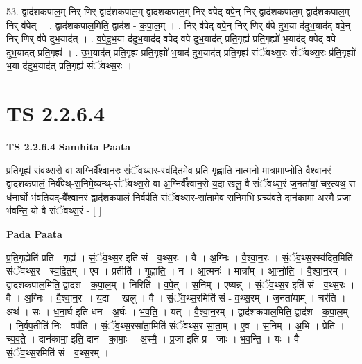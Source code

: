 \documentclass[17pt]{extarticle}
\begin{document}
53. द्वाद॑शकपाल॒म् निर् णिर् द्वाद॑शकपाल॒म् द्वाद॑शकपाल॒म् निर् व॑पेद् वपे॒न् निर् द्वाद॑शकपाल॒म् द्वाद॑शकपाल॒म् निर् व॑पेत् । . द्वाद॑शकपाल॒मिति॒ द्वाद॑श - क॒पा॒ल॒म् । . निर् व॑पेद् वपे॒न् निर् णिर् व॑पे दुभ॒या द॑दुभ॒याद॑द् वपे॒न् निर् णिर् व॑पे दुभ॒याद॑त् । . व॒पे॒दु॒भ॒या द॑दुभ॒याद॑द् वपेद् वपे दुभ॒याद॑त् प्रति॒गृह्य॑ प्रति॒गृह्यो॑ भ॒याद॑द् वपेद् वपे दुभ॒याद॑त् प्रति॒गृह्य॑ । . उ॒भ॒याद॑त् प्रति॒गृह्य॑ प्रति॒गृह्यो॑ भ॒याद॑ दुभ॒याद॑त् प्रति॒गृह्य॑ संॅवथ्स॒रः सं॑ॅवथ्स॒रः प्र॑ति॒गृह्यो॑ भ॒या द॑दुभ॒याद॑त् प्रति॒गृह्य॑ संॅवथ्स॒रः । \newline
\pagebreak
{}

\section{ TS 2.2.6.4 }

\textbf{TS 2.2.6.4 } \newline
\textbf{Samhita Paata} \newline

प्रति॒गृह्य॑ संवथ्स॒रो वा अ॒ग्निर्वै᳚श्वान॒रः सं॑ॅवथ्स॒र-स्व॑दितमे॒व प्रति॑ गृह्णाति॒ नात्मनो॒ मात्रा॑माप्नोति वैश्वान॒रं द्वाद॑शकपालं॒ निर्व॑पेथ्-स॒निमे॒ष्यन्थ्-सं॑ॅवथ्स॒रो वा अ॒ग्निर्वै᳚श्वान॒रो य॒दा खलु॒ वै सं॑ॅवथ्स॒रं ज॒नता॑यां॒ चर॒त्यथ॒ स ध॑ना॒र्घो भ॑वति॒यद्-वै᳚श्वान॒रं द्वाद॑शकपालं नि॒र्वप॑ति संॅवथ्स॒र-सा॑तामे॒व स॒निम॒भि प्रच्य॑वते॒ दान॑कामा अस्मै प्र॒जा भ॑वन्ति॒ यो वै सं॑ॅवथ्स॒रं - [  ] \newline

\textbf{Pada Paata} \newline

प्र॒ति॒गृह्येति॑ प्रति - गृह्य॑ । सं॒ॅव॒थ्स॒र इति॑ सं - व॒थ्स॒रः । वै । अ॒ग्निः । वै॒श्वा॒न॒रः । सं॒ॅव॒थ्स॒रस्व॑दित॒मिति॑ संॅवथ्स॒र - स्व॒दि॒त॒म् । ए॒व । प्रतीति॑ । गृ॒ह्णा॒ति॒ । न । आ॒त्मनः॑ । मात्रा᳚म् । आ॒प्नो॒ति॒ । वै॒श्वा॒न॒रम् । द्वाद॑शकपाल॒मिति॒ द्वाद॑श - क॒पा॒ल॒म् । निरिति॑ । व॒पे॒त् । स॒निम् । ए॒ष्यन्न् । सं॒ॅव॒थ्स॒र इति॑ सं - व॒थ्स॒रः । वै । अ॒ग्निः । वै॒श्वा॒न॒रः । य॒दा । खलु॑ । वै । सं॒ॅव॒थ्स॒रमिति॑ सं - व॒थ्स॒रम् । ज॒नता॑याम् । चर॑ति । अथ॑ । सः । ध॒ना॒र्घ इति॑ धन - अ॒र्घः । भ॒व॒ति॒॒ । यत् । वै॒श्वा॒न॒रम् । द्वाद॑शकपाल॒मिति॒ द्वाद॑श - क॒पा॒ल॒म् । नि॒र्वप॒तीति॑ निः - वप॑ति । सं॒ॅव॒थ्स॒रसा॑ता॒मिति॑ संॅवथ्स॒र-सा॒ता॒म् । ए॒व । स॒निम् । अ॒भि । प्रेति॑ । च्य॒व॒ते॒ । दान॑कामा॒ इति॒ दान॑ - का॒माः॒ । अ॒स्मै॒ । प्र॒जा इति॑ प्र - जाः । भ॒व॒न्ति॒ । यः । वै । सं॒ॅव॒थ्स॒रमिति॑ सं - व॒थ्स॒रम् ।  \newline
\end{document}
